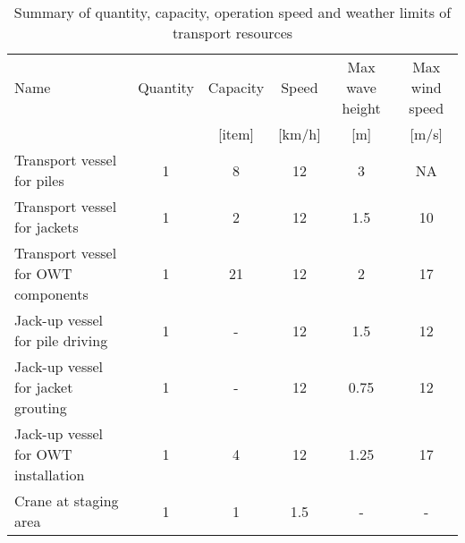\begin{table}
\label{tab:input}
\begin{tabular}{lccccc}
\hline 
Name & Quantity & Capacity & Speed & Max wave height & Max wind speed \\
& & [item] & [km/h] & [m] & [m/s] \\ 
\hline 
Transport vessel for piles & 1 & 8 & 12 & 3 & NA \\ 
Transport vessel for jackets & 1 & 2 & 12 & 1.5 & 10 \\ 
Transport vessel for OWT components & 1 & 21 & 12 & 2 & 17 \\ 
Jack-up vessel for pile driving & 1 & - & 12 & 1.5 & 12\\
Jack-up vessel for jacket grouting & 1 & - & 12 & 0.75 & 12\\
Jack-up vessel for OWT installation & 1 & 4 & 12 & 1.25 & 17 \\
Crane at staging area & 1 & 1 & 1.5 & - & - \\
\hline 
\end{tabular}

\caption{Summary of quantity, capacity, operation speed and weather limits of transport resources}
\end{table}

